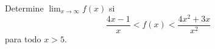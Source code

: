 \item Determine $\displaystyle \lim_{x \to \infty} f(x)$ si
    $$\frac{4x - 1}{x} < f(x) < \frac{4x^2 + 3x}{x^2}$$
    para todo $x > 5$.
